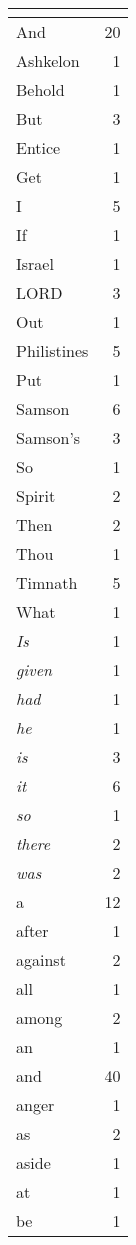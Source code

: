 \begin{center}
\begin{longtable}{l|r}
\hline \multicolumn{2}{c}{{ }} \\ \hline
\endfoot 
And & 20\\ \hline 
Ashkelon & 1\\ \hline 
Behold & 1\\ \hline 
But & 3\\ \hline 
Entice & 1\\ \hline 
Get & 1\\ \hline 
I & 5\\ \hline 
If & 1\\ \hline 
Israel & 1\\ \hline 
LORD & 3\\ \hline 
Out & 1\\ \hline 
Philistines & 5\\ \hline 
Put & 1\\ \hline 
Samson & 6\\ \hline 
Samson's & 3\\ \hline 
So & 1\\ \hline 
Spirit & 2\\ \hline 
Then & 2\\ \hline 
Thou & 1\\ \hline 
Timnath & 5\\ \hline 
What & 1\\ \hline 
\emph{Is} & 1\\ \hline 
\emph{given} & 1\\ \hline 
\emph{had} & 1\\ \hline 
\emph{he} & 1\\ \hline 
\emph{is} & 3\\ \hline 
\emph{it} & 6\\ \hline 
\emph{so} & 1\\ \hline 
\emph{there} & 2\\ \hline 
\emph{was} & 2\\ \hline 
a & 12\\ \hline 
after & 1\\ \hline 
against & 2\\ \hline 
all & 1\\ \hline 
among & 2\\ \hline 
an & 1\\ \hline 
and & 40\\ \hline 
anger & 1\\ \hline 
as & 2\\ \hline 
aside & 1\\ \hline 
at & 1\\ \hline 
be & 1\\ \hline 

\end{longtable}
\end{center}
